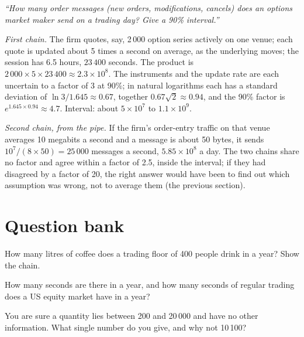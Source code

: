 \begin{example}\label{ex:iv:estimation:orders}
\emph{``How many order messages (new orders, modifications, cancels) does an options market maker send on a
trading day? Give a 90\% interval.''}

\emph{First chain.} The firm quotes, say, 2\,000 option series actively on one venue; each quote is updated about 5 times a
second on average, as the underlying moves; the session has 6.5 hours, $23\,400$ seconds. The product is $2\,000 \times 5
\times 23\,400 \approx 2.3 \times 10^8$. The instruments and the update rate are each uncertain to a factor of 3 at 90\%;
in natural logarithms each has a standard deviation of $\ln 3/1.645 \approx 0.67$, together $0.67\sqrt2 \approx 0.94$,
and the 90\% factor is $e^{1.645 \times 0.94} \approx 4.7$. Interval: about $5 \times 10^7$ to $1.1 \times 10^9$.

\emph{Second chain, from the pipe.} If the firm's order-entry traffic on that venue averages 10 megabits a second and a
message is about 50 bytes, it sends $10^7/(8 \times 50) = 25\,000$ messages a second, $5.85 \times 10^8$ a day. The two
chains share no factor and agree within a factor of 2.5, inside the interval; if they had disagreed by a factor of 20,
the right answer would have been to find out which assumption was wrong, not to average them (the
previous section).
\end{example}

\section{Question bank}

\begin{interviewq}\label{iq:iv:estimation:1}
How many litres of coffee does a trading floor of 400 people drink in a year? Show the chain.
\end{interviewq}

\begin{interviewq}\label{iq:iv:estimation:2}
How many seconds are there in a year, and how many seconds of regular trading does a US equity market have in
a year?
\end{interviewq}

\begin{interviewq}\label{iq:iv:estimation:3}
You are sure a quantity lies between 200 and 20\,000 and have no other information. What single number do you
give, and why not 10\,100?
\end{interviewq}

